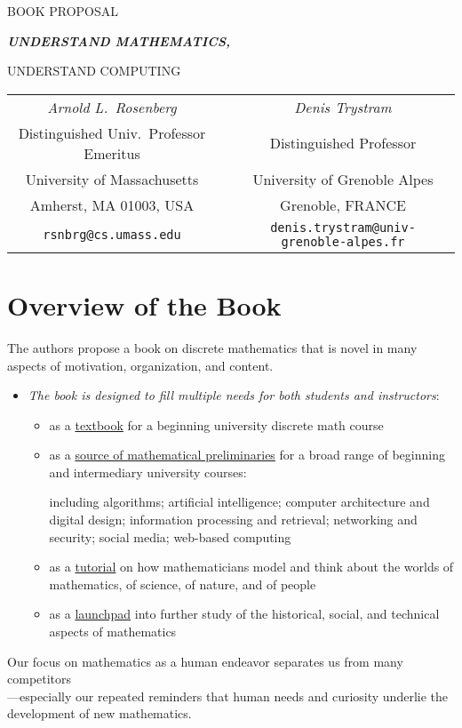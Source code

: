 \documentclass{article}[12pt]
\begin{document}
\begin{center}
BOOK PROPOSAL 

\bigskip

{\large\bf\em UNDERSTAND MATHEMATICS,

UNDERSTAND COMPUTING}
\end{center}

\begin{center}
\begin{tabular}{ccc}
{\em Arnold L.~Rosenberg} & & {\em Denis Trystram} \\
Distinguished Univ.~Professor Emeritus
  & & Distinguished Professor \\
University of Massachusetts  & & University of Grenoble Alpes \\
Amherst, MA 01003, USA       & & Grenoble, FRANCE \\
{\small\tt rsnbrg@cs.umass.edu} & & {\small\tt denis.trystram@univ-grenoble-alpes.fr}
\end{tabular}
\end{center}

\section*{Overview of the Book}

The authors propose a book on discrete mathematics that is novel in many aspects of motivation, organization, and content.
\begin{itemize}
\item
{\em The book is designed to fill multiple needs for both students and instructors}:
  \begin{itemize}
  \item
as a \underline{textbook} for a beginning university discrete math course

  \item
as a \underline{source of mathematical preliminaries} for a broad range of beginning and intermediary university courses:

\smallskip

including algorithms; artificial intelligence; computer architecture and digital design; information processing and retrieval; networking and security; social media; web-based computing

  \item
as a \underline{tutorial} on how mathematicians model and think about the worlds of mathematics, of science, of nature, and of people

  \item
as a \underline{launchpad} into further study of the historical, social, and technical aspects of mathematics
  \end{itemize}
\end{itemize}
{\sf Our focus on mathematics as a human endeavor separates us from many competitors \\
---especially our repeated reminders that human needs and curiosity underlie the development of new mathematics.}
\end{document}
